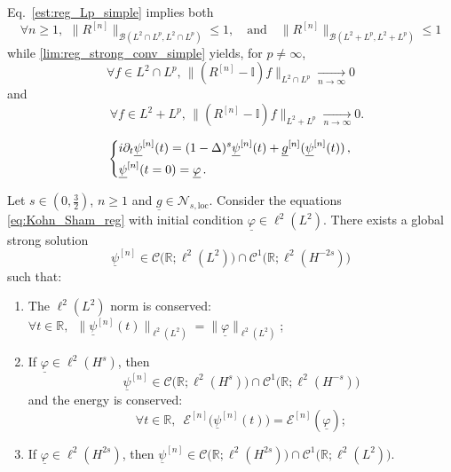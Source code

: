\documentclass[10pt,a4paper]{amsart}
\newcommand{\Nloc}{\mathscr{N}_{s,\mathrm{loc}}}
\newcommand{\ulg}{\underline{g}}
\newcommand{\ulphi}{\underline{\varphi}}
\newcommand{\ulpsi}{\underline{\psi}}
\begin{document}
	\begin{remark}
		Eq.~\eqref{est:reg_Lp_simple} implies both
		\begin{equation}
			\label{est:reg_Lp}
			\forall n \geq 1, \,\ \| R^{[n]} \|_{\mathcal{B}(L^2\cap L^p,L^2\cap L^p)} \leq 1 , \quad \text{and} \quad \| R^{[n]} \|_{\mathcal{B}(L^2+ L^p,L^2+ L^p)} \leq 1
		\end{equation}
		while \eqref{lim:reg_strong_conv_simple} yields, for $p\neq \infty$,
		\begin{equation}
			\label{lim:reg_strong_conv_cap}
			\forall f \in L^2\cap L^p, \, \| (R^{[n]} - \mathbb{I} ) f \|_{L^2\cap L^p} 
			\xrightarrow[n \rightarrow \infty]{} 0
		\end{equation}
		and
		\begin{equation}
			\quad \forall  f \in L^2+ L^p, \, \| (R^{[n]} - \mathbb{I} ) f \|_{L^2+L^p} 
			\xrightarrow[n \rightarrow \infty]{} 0.\label{lim:reg_strong_conv_plus}
		\end{equation}
	\end{remark}

	\begin{equation}
		\label{eq:Kohn_Sham_reg}
		\begin{dcases}
			i \partial_t \ulpsi^{[n]}(t) = (1-\Delta)^s \ulpsi^{[n]}(t) +  \ulg^{[n]} (\ulpsi^{[n]}(t)) \, ,\\
			\ulpsi^{[n]}(t=0)= \ulphi  \, .
		\end{dcases}
	\end{equation}

	\begin{theorem}\label{thm:existence_regularized}
		Let $s\in(0,\frac32)$, $n \geq 1$ and $\ulg\in\Nloc$. Consider the equations \eqref{eq:Kohn_Sham_reg} with initial condition $ \ulphi  \in \ell^2(L^2) $. There exists a global strong solution
		\[
		\ulpsi^{[n]} \in \mathscr{C}\big(\mathbb{R};\ell^2(L^2)\big) \cap \mathscr{C}^1 \big(\mathbb{R};\ell^2(H^{-2s})\big)
		\]
		such that:
		\begin{enumerate}[label=\roman*)]
			\item The $ \ell^2(L^2) $ norm is conserved: $ \forall t \in \mathbb{R},\;\ \| \ulpsi^{[n]}(t) \|_{\ell^2(L^2)} = \| \ulphi  \|_{\ell^2(L^2)} $;
			\item \label{it:cons_en} If $ \ulphi  \in \ell^2(H^{s}) $, then %
			\begin{equation*}
				\ulpsi^{[n]} \in \mathscr{C}\big(\mathbb{R};\ell^2(H^{s})\big) \cap \mathscr{C}^1\big(\mathbb{R};\ell^2(H^{-s})\big)
			\end{equation*}
			and the energy is conserved: 
			\[ \forall t \in \mathbb{R}, \;\ \mathcal{E}^{[n]}\big(\ulpsi^{[n]}(t)\big) = \mathcal{E}^{[n]}(\ulphi ) ; \]
			\item If $ \ulphi  \in \ell^2(H^{2s}) $, then $ \ulpsi^{[n]} \in \mathscr{C}\big(\mathbb{R};\ell^2(H^{2s})\big) \cap \mathscr{C}^1\big(\mathbb{R};\ell^2(L^2)\big) $.
		\end{enumerate}
	\end{theorem}
\end{document}

